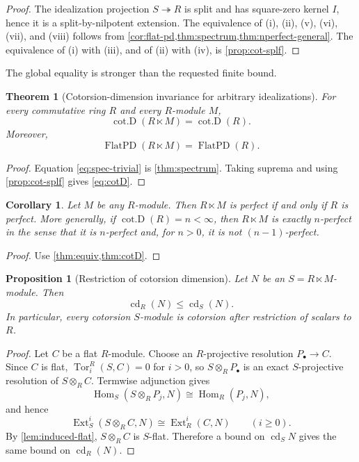 \documentclass[11pt,reqno]{amsart}
\newcommand{\cd}{\operatorname{cd}}
\newcommand{\cotD}{\operatorname{cot.D}}
\newcommand{\Tor}{\operatorname{Tor}}
\newcommand{\Ext}{\operatorname{Ext}}
\newcommand{\FlatPD}{\operatorname{FlatPD}}
\theoremstyle{plain}
\newtheorem{theorem}{Theorem}[section]
\newtheorem{proposition}[proposition]{Proposition}
\newtheorem{corollary}[corollary]{Corollary}
\theoremstyle{definition}
\theoremstyle{remark}
\begin{document}
\begin{proof}
The idealization projection $S\twoheadrightarrow R$ is split and has square-zero
kernel $I$, hence it is a split-by-nilpotent extension.  The equivalence of
(i), (ii), (v), (vi), (vii), and (viii) follows from
\cref{cor:flat-pd,thm:spectrum,thm:nperfect-general}.  The equivalence of
(i) with (iii), and of (ii) with (iv), is \cref{prop:cot-splf}.
\end{proof}

The global equality is stronger than the requested finite bound.

\begin{theorem}[Cotorsion-dimension invariance for arbitrary idealizations]\label{thm:cotD}
For every commutative ring $R$ and every $R$-module $M$,
\begin{equation}\label{eq:cotD}
   {\ \cotD(R\ltimes M)=\cotD(R).\ }
\end{equation}
Moreover,
\begin{equation}\label{eq:spec-trivial}
   \FlatPD(R\ltimes M)=\FlatPD(R).
\end{equation}
\end{theorem}

\begin{proof}
Equation \eqref{eq:spec-trivial} is \cref{thm:spectrum}.  Taking suprema and using
\cref{prop:cot-splf} gives \eqref{eq:cotD}.
\end{proof}

\begin{corollary}\label{cor:perfect-arbitrary}
Let $M$ be any $R$-module.  Then $R\ltimes M$ is perfect if and only if $R$ is
perfect.  More generally, if $\cotD(R)=n<\infty$, then $R\ltimes M$ is exactly
$n$-perfect in the sense that it is $n$-perfect and, for $n>0$, it is not
$(n-1)$-perfect.
\end{corollary}

\begin{proof}
Use \cref{thm:equiv,thm:cotD}.
\end{proof}

\begin{proposition}[Restriction of cotorsion dimension]\label{prop:cd-restrict}
Let $N$ be an $S=R\ltimes M$-module.  Then
\[
   \cd_R( N)\le\cd_S(N).
\]
In particular, every cotorsion $S$-module is cotorsion after restriction of
scalars to $R$.
\end{proposition}

\begin{proof}
Let $C$ be a flat $R$-module.  Choose an $R$-projective resolution
$P_\bullet\to C$.  Since $C$ is flat,
$\Tor_i^R(S,C)=0$ for $i>0$, so $S\otimes_RP_\bullet$ is an exact
$S$-projective resolution of $S\otimes_RC$.  Termwise adjunction gives
\[
 \operatorname{Hom}_S(S\otimes_RP_j,N)
 \cong\operatorname{Hom}_R(P_j,N),
\]
and hence
\begin{equation}\label{eq:Extind}
 \Ext_S^i(S\otimes_RC,N)
 \cong \Ext_R^i(C,N)
 \qquad(i\ge0).
\end{equation}
By \cref{lem:induced-flat}, $S\otimes_RC$ is $S$-flat.  Therefore a bound on
$\cd_SN$ gives the same bound on $\cd_R(N)$.
\end{proof}
\end{document}
